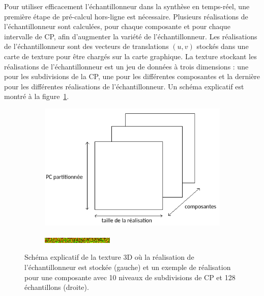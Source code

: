 \bigskip

Pour utiliser efficacement l'échantillonneur dans la synthèse en temps-réel, une première étape de pré-calcul hors-ligne est nécessaire. Plusieurs réalisations de l'échantillonneur sont calculées, pour chaque composante et pour chaque intervalle de CP, afin d'augmenter la variété de l'échantillonneur. Les réalisations de l'échantillonneur sont des vecteurs de translations $(u, v)$ stockés dans une carte de texture pour être chargés sur la carte graphique. La texture stockant les réalisations de l'échantillonneur est un jeu de données à trois dimensions : une pour les subdivisions de la CP, une pour les différentes composantes et la dernière pour les différentes réalisations de l'échantillonneur. Un schéma explicatif est montré à la figure~\ref{fig:sampler-realization}.

\begin{figure}
    \centering
    \begin{subfigure}{.5\textwidth}
        \centering
        \includegraphics[width=\textwidth]{contenu/resources/images/sampler_realization}
    \end{subfigure}
    \hfill
    \begin{subfigure}{.45\textwidth}
        \centering
        \includegraphics[width=\textwidth]{contenu/resources/images/realization_pc_0}
    \end{subfigure}

    \caption[Réalisation de l'échantillonneur préférentiel]{Schéma explicatif de la texture 3D où la réalisation de l'échantillonneur est stockée (gauche) et un exemple de réalisation pour une composante avec 10 niveaux de subdivisions de CP et 128 échantillons (droite).}
    \label{fig:sampler-realization}
\end{figure}


